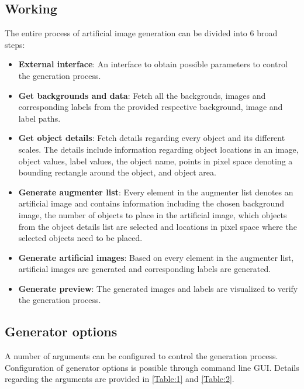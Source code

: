 \documentclass[paper=a4,11pt,parskip=half,toc=listof]{scrartcl}
\begin{document}
\subsection{Working}
The entire process of artificial image generation can be divided into 6 broad steps:
	\begin{itemize}
		\item \textbf{External interface}: An interface to obtain possible parameters to control the generation process.
		\item \textbf{Get backgrounds and data}: Fetch all the backgrouds, images and corresponding labels from the provided respective background, image and label paths.
		\item \textbf{Get object details}: Fetch details regarding every object and its different scales. The details include information regarding object locations in an image, object values, label values, the object name, points in pixel space denoting a bounding rectangle around the object, and object area.
		\item \textbf{Generate augmenter list}: Every element in the augmenter list denotes an artificial image and contains information including the chosen background image, the number of objects to place in the artificial image, which objects from the object details list are selected and locations in pixel space where the selected objects need to be placed.
		\item \textbf{Generate artificial images}: Based on every element in the augmenter list, artificial images are generated and corresponding labels are generated.
		\item \textbf{Generate preview}: The generated images and labels are visualized to verify the generation process.
	\end{itemize}
		

	
\subsection{Generator options}

A number of arguments can be configured to control the generation process. Configuration of generator options is possible through command line GUI. Details regarding the arguments are provided in \ref{Table:1} and \ref{Table:2}. 
\end{document}
